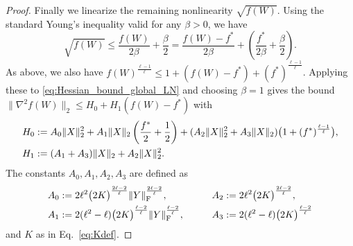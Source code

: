 \documentclass[a4paper,11pt]{article}
\DeclarePairedDelimiter{\norm}{\|}{\|}
\newcommand{\1}{\mathbbm{1}}
\theoremstyle{plain}
\begin{document}
\begin{proof}
Finally we linearize the remaining nonlinearity $\sqrt{f(W)}$.
Using the standard Young's inequality valid for any $\beta>0$, we have
\[
\sqrt{f(W)} \le \frac{f(W)}{2\beta} + \frac{\beta}{2}
= \frac{f(W)-f^*}{2\beta} + \left( \frac{f^*}{2\beta} + \frac{\beta}{2} \right).
\]
As above, we also have $f(W)^{\frac{\ell-1}{\ell}}\le 1+(f(W)-f^*)+(f^*)^{\frac{\ell-1}{\ell}}$.
Applying these to \eqref{eq:Hessian_bound_global_LN} and choosing $\beta=1$ gives the bound
$\|\nabla^2 f(W)\|_2 \leq H_0 + H_1 (f(W)-f^*)$ with 
\begin{align}
\label{eq:global_constants_linear_network}
 &H_0 :=A_0 \norm{X}_2^2 + A_1 \norm{X}_2 \left(\frac{f^*}{2} + \frac{1}{2}\right) + (A_2 \norm{X}_2^2+A_3 \norm{X}_2)\bigl(1+(f^*)^{\frac{\ell-1}{\ell}}\bigr), \nonumber \\
&H_1 := (A_1 + A_3) \|X\|_2 + A_2 \norm{X}_2^2
.
\end{align}
The constants $A_0, A_1, A_2, A_3$ are defined as
\begin{align}
\label{eq:A0123}
A_0 &:=2\ell^2 \bigl(2K\bigr)^{\frac{2\ell-2}{\ell}} \norm{Y}_{\mathrm F}^{\frac{2\ell-2}{\ell}},
&\qquad
A_2 &:=2\ell^2 \bigl(2K\bigr)^{\frac{2\ell-2}{\ell}}, \\
A_1 &:=2(\ell^2-\ell) \bigl(2K\bigr)^{\frac{\ell-2}{\ell}} \norm{Y}_{\mathrm F}^{\frac{\ell-2}{\ell}},
&
A_3 &:=2(\ell^2-\ell) \bigl(2K\bigr)^{\frac{\ell-2}{\ell}}
\end{align}
and $K$ as in Eq.~\eqref{eq:Kdef}.


\end{proof}
\end{document}
